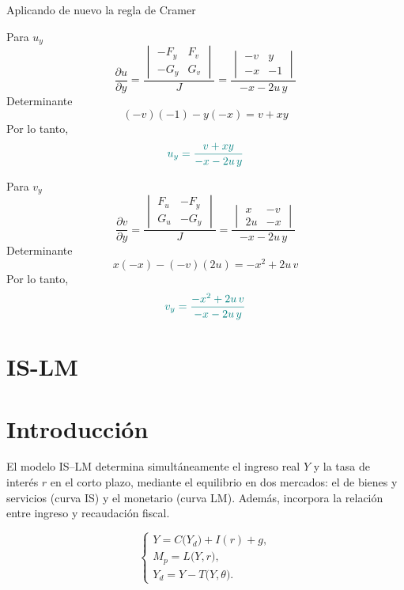 \documentclass{article}
\begin{document}
Aplicando de nuevo la regla de Cramer

Para \( \displaystyle u_y\)
\[
\frac{\partial u}{\partial y} =
\frac{
\begin{vmatrix}
- F_y & F_v \\
- G_y & G_v
\end{vmatrix}
}{J}
=\frac{
\begin{vmatrix}
- v & y \\
- x & -1
\end{vmatrix}
}{-x - 2u\,y}
\]
Determinante
\[
(-v)(-1) - y(-x) = v + xy
\]
Por lo tanto,
\[\color{teal}
u_y = \frac{v + xy}{-x - 2u\,y}
\]

Para \( \displaystyle v_y\)
\[
\frac{\partial v}{\partial y} =
\frac{
\begin{vmatrix}
F_u & - F_y \\
G_u & - G_y
\end{vmatrix}
}{J}
=\frac{
\begin{vmatrix}
x & - v \\
2u & - x
\end{vmatrix}
}{-x - 2u\,y}
\]
Determinante
\[
x(-x) - (-v)(2u) = -x^2 + 2u\,v
\]
Por lo tanto,
\[\color{teal}
v_y = \frac{-x^2 + 2u\,v}{-x - 2u\,y}
\]



\newpage
\section{IS-LM}




\section*{Introducción}


El modelo IS–LM determina simultáneamente el ingreso real \(Y\) y la tasa de interés \(r\) en el corto plazo, mediante el equilibrio en dos mercados: el de bienes y servicios (curva IS) y el monetario (curva LM). Además, incorpora la relación entre ingreso y recaudación fiscal.

\[
\begin{cases}
Y = C\bigl(Y_d\bigr) + I(r) + g,\\[6pt]
M_p = L\bigl(Y,r\bigr),\\[6pt]
Y_d = Y - T\bigl(Y,\theta\bigr).
\end{cases}
\]

\bigskip
\end{document}
